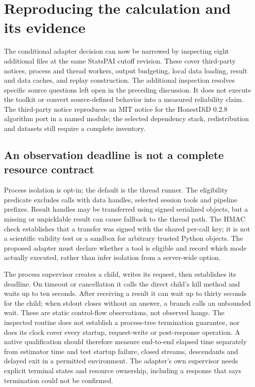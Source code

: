\section{Reproducing the calculation and its evidence}
\label{exec23:statspai-runtime-scope}
The conditional adapter decision can now be narrowed by inspecting eight
additional files at the same StatsPAI cutoff revision. These cover third-party
notices, process and thread workers, output budgeting, local data loading,
result and data caches, and replay construction. The additional inspection
resolves specific source questions left open in the preceding discussion.
It does not execute the toolkit or convert source-defined behavior into a
measured reliability claim. The third-party notice reproduces an MIT notice
for the HonestDiD 0.2.8 algorithm port in a named module; the selected dependency
stack, redistribution and datasets still require a complete inventory.
\citep{exec23_statspai_runtime}

\subsection{An observation deadline is not a complete resource contract}
\label{exec23:statspai-runtime-deadline}
Process isolation is opt-in; the default is the thread runner. The eligibility
predicate excludes calls with data handles, selected session tools and pipeline
prefixes. Result handles may be transferred using signed serialized objects,
but a missing or unpicklable result can cause fallback to the thread path.
The HMAC check establishes that a transfer was signed with the shared per-call
key; it is not a scientific validity test or a sandbox for arbitrary trusted
Python objects. The proposed adapter must declare whether a tool is eligible
and record which mode actually executed, rather than infer isolation from a
server-wide option.
\citep{exec23_statspai_runtime}

The process supervisor creates a child, writes its request, then establishes
its deadline. On timeout or cancellation it calls the direct child's kill
method and waits up to ten seconds. After receiving a result it can wait up to
thirty seconds for the child; when stdout closes without an answer, a branch
calls an unbounded wait. These are static control-flow observations, not
observed hangs. The inspected routine does not establish a process-tree
termination guarantee, nor does its clock cover every startup, request-write
or post-response operation. A native qualification should therefore measure
end-to-end elapsed time separately from estimator time and test startup failure,
closed streams, descendants and delayed exit in a permitted environment.
The adapter's own supervisor needs explicit terminal states and resource
ownership, including a response that says termination could not be confirmed.
\citep{exec23_statspai_runtime}

